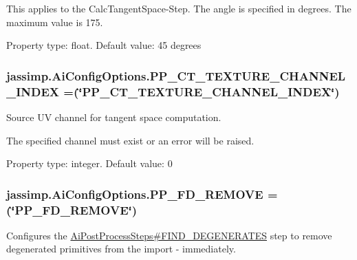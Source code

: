 This applies to the Calc\+Tangent\+Space-\/\+Step. The angle is specified in degrees. The maximum value is 175.

Property type\+: float. Default value\+: 45 degrees \hypertarget{enumjassimp_1_1_ai_config_options_ae155df729f404509c744f7baad6e2abd}{
\subsubsection[{P\+P\+\_\+\+C\+T\+\_\+\+T\+E\+X\+T\+U\+R\+E\+\_\+\+C\+H\+A\+N\+N\+E\+L\+\_\+\+I\+N\+D\+E\+X}]{\setlength{\rightskip}{0pt plus 5cm}jassimp.\+Ai\+Config\+Options.\+P\+P\+\_\+\+C\+T\+\_\+\+T\+E\+X\+T\+U\+R\+E\+\_\+\+C\+H\+A\+N\+N\+E\+L\+\_\+\+I\+N\+D\+E\+X =(\char`\"{}P\+P\+\_\+\+C\+T\+\_\+\+T\+E\+X\+T\+U\+R\+E\+\_\+\+C\+H\+A\+N\+N\+E\+L\+\_\+\+I\+N\+D\+E\+X\char`\"{})}}\label{enumjassimp_1_1_ai_config_options_ae155df729f404509c744f7baad6e2abd}
Source U\+V channel for tangent space computation.

The specified channel must exist or an error will be raised.

Property type\+: integer. Default value\+: 0 \hypertarget{enumjassimp_1_1_ai_config_options_ac70de20a5158550327631e618b20cc7c}{
\subsubsection[{P\+P\+\_\+\+F\+D\+\_\+\+R\+E\+M\+O\+V\+E}]{\setlength{\rightskip}{0pt plus 5cm}jassimp.\+Ai\+Config\+Options.\+P\+P\+\_\+\+F\+D\+\_\+\+R\+E\+M\+O\+V\+E =(\char`\"{}P\+P\+\_\+\+F\+D\+\_\+\+R\+E\+M\+O\+V\+E\char`\"{})}}\label{enumjassimp_1_1_ai_config_options_ac70de20a5158550327631e618b20cc7c}
Configures the \hyperlink{enumjassimp_1_1_ai_post_process_steps_abf87e4bf911759a4141e5ba4596e29c1}{Ai\+Post\+Process\+Steps\#\+F\+I\+N\+D\+\_\+\+D\+E\+G\+E\+N\+E\+R\+A\+T\+E\+S} step to remove degenerated primitives from the import -\/ immediately.

